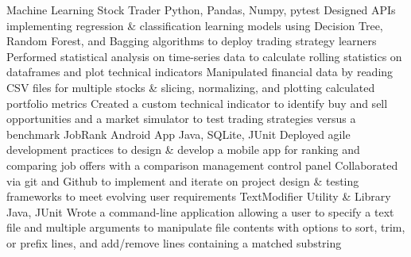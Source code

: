 %
%
%
%
%
\justifiedsubsection%
{Machine Learning Stock Trader}
{Python, Pandas, Numpy, pytest}
%
\workitemsFour%
{%
Designed APIs implementing regression \& classification learning models using Decision Tree, Random Forest, and Bagging algorithms to deploy trading strategy learners
}%
{%
Performed statistical analysis on time-series data to calculate rolling statistics on dataframes and plot technical indicators
}%
{%
Manipulated financial data by reading CSV files for multiple stocks \& slicing, normalizing, and plotting calculated portfolio metrics
}%
{%
Created a custom technical indicator to identify buy and sell opportunities and a market simulator to test trading strategies versus a benchmark
}%
%
%
%
%
\justifiedsubsection%
{JobRank Android App}
{Java, SQLite, JUnit}
%
\workitemsTwo%
{%
Deployed agile development practices to design \& develop a mobile app for ranking and comparing job offers with a comparison management control panel
}%
{%
Collaborated via git and Github to implement and iterate on project design \& testing frameworks to meet evolving user requirements
}%
%
%
%
%
\justifiedsubsection%
{TextModifier Utility \& Library}
{Java, JUnit}
%
\workitemsThree%
{%
Wrote a command-line application allowing a user to specify a text file and multiple arguments to manipulate file contents with options to sort, trim, or prefix lines, and add/remove lines containing a matched substring
}%
